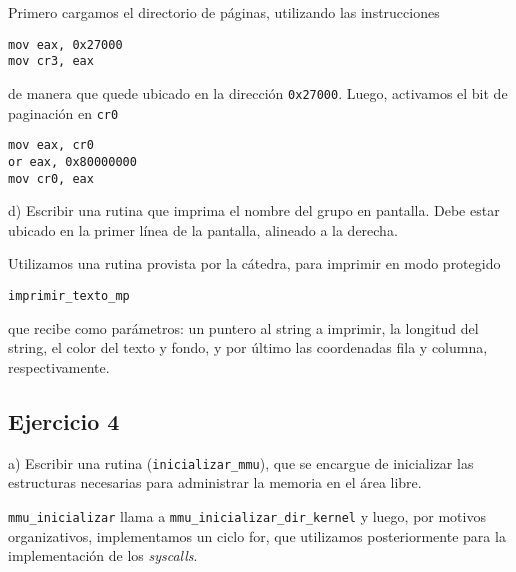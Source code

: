 \vspace*{0.3cm}

Primero cargamos el directorio de p\'aginas, utilizando las instrucciones 

\begin{verbatim}
mov eax, 0x27000
mov cr3, eax 
\end{verbatim}

de manera que quede ubicado en la direcci\'on \verb|0x27000|. Luego, activamos el bit de paginaci\'on en \verb|cr0|

\begin{verbatim}
mov eax, cr0
or eax, 0x80000000
mov cr0, eax 
\end{verbatim}


\vspace*{0.5cm} \noindent



\noindent
d) Escribir una rutina que imprima el nombre del grupo en pantalla. Debe estar ubicado en la primer línea
de la pantalla, alineado a la derecha.

\vspace*{0.3cm}

Utilizamos una rutina provista por la c\'atedra, para imprimir en modo protegido

\verb|imprimir_texto_mp|

que recibe como par\'ametros: un puntero al string a imprimir, la longitud del string, el color del texto y fondo, 
y por \'ultimo las coordenadas fila y columna, respectivamente.

\vspace*{0.5cm} \noindent



\newpage





\subsection*{Ejercicio 4}
\vspace*{0.5cm}

\noindent
a) Escribir una rutina (\verb|inicializar_mmu|), que se encargue de inicializar las estructuras necesarias para administrar 
la memoria en el área libre.

\vspace*{0.3cm}

\verb|mmu_inicializar| llama a \verb|mmu_inicializar_dir_kernel| y luego, por motivos organizativos, implementamos 
un ciclo for, que utilizamos posteriormente para la implementaci\'on de los \textit{syscalls}.


